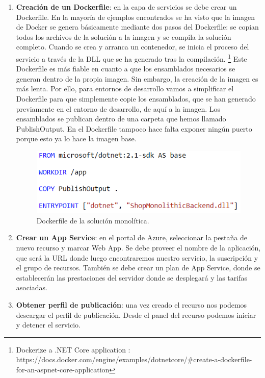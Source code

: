\documentclass[11pt,spanish,listoffigures]{tfgetsinf}
\begin{document}
\begin{enumerate}

\item \textbf{Creación de un Dockerfile}: en la capa de servicios se debe crear un Dockerfile. En la mayoría de ejemplos encontrados se ha visto que la imagen de Docker se genera básicamente mediante dos pasos del Dockerfile: se copian todos los archivos de la solución a la imagen y se compila la solución completo. Cuando se crea y arranca un contenedor, se inicia el proceso del servicio a través de la DLL que se ha generado tras la compilación. \footnote{ Dockerize a .NET Core application
: https://docs.docker.com/engine/examples/dotnetcore/\#create-a-dockerfile-for-an-aspnet-core-application} Este Dockerfile es más fiable en cuanto a que los ensamblados necesarios se generan dentro de la propia imagen. Sin embargo, la creación de la imagen es más lenta. Por ello, para entornos de desarrollo vamos a simplificar el Dockerfile para que simplemente copie los ensamblados, que se han generado previamente en el entorno de desarrollo, de aquí a la imagen. Los ensamblados se publican dentro de una carpeta que hemos llamado PublishOutput. En el Dockerfile tampoco hace falta exponer ningún puerto porque esto ya lo hace la imagen base.

\begin{figure}[h]
\centering
\includegraphics[scale=0.8]{Dockerfile}
\caption{Dockerfile de la solución monolítica.}
\end{figure}

\item \textbf{Crear un App Service}: en el portal de Azure, seleccionar la pestaña de nuevo recurso y marcar Web App. Se debe proveer el nombre de la aplicación, que será la URL donde luego encontraremos nuestro servicio, la suscripción y el grupo de recursos. También se debe crear un plan de App Service, donde se establecerán las prestaciones del servidor donde se desplegará y las tarifas asociadas. 

\item \textbf{Obtener perfil de publicación}: una vez creado el recurso nos podemos descargar el perfil de publicación. Desde el panel del recurso podemos iniciar y detener el servicio.


\end{enumerate}
\end{document}
